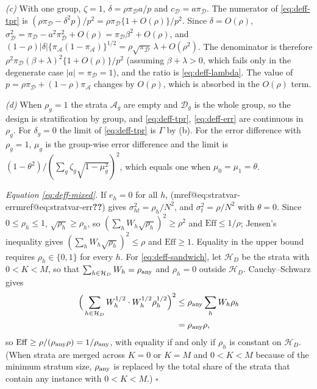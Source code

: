 \documentclass[pdflatex,sn-mathphys-num,iicol]{sn-jnl}
\makeatletter
\theoremstyle{thmstyleone}
\theoremstyle{thmstyletwo}
\theoremstyle{thmstylethree}
\newcommand{\Mref}[1]{\ifcsname mref@#1\endcsname\csname mref@#1\endcsname\else\textbf{??}\fi}
\makeatother
\begin{document}
\emph{(c)} With one group, $\zeta=1$, $\delta=\rho\pi_{\mathcal D}a/p$ and
$c_{\mathcal D}=a\pi_{\mathcal D}$. The numerator of \eqref{eq:deff-tpr} is
$(\rho\pi_{\mathcal D}-\delta^2p)/p^2=\rho\pi_{\mathcal D}\{1+O(\rho)\}/p^2$. Since $\delta=O(\rho)$,
$\sigma^2_{\mathcal D}=\pi_{\mathcal D}-a^2\pi_{\mathcal D}^2+O(\rho)=\pi_{\mathcal D}\beta^2+O(\rho)$, and
$(1-\rho)|\delta|\{\pi_{\mathcal A}(1-\pi_{\mathcal A})\}^{1/2}=\rho\sqrt{\pi_{\mathcal D}}\,\lambda+O(\rho^2)$.
The denominator is therefore $\rho^2\pi_{\mathcal D}(\beta+\lambda)^2\{1+O(\rho)\}/p^2$ (assuming
$\beta+\lambda>0$, which fails only in the degenerate case $|a|=\pi_{\mathcal D}=1$), and the ratio is
\eqref{eq:deff-lambda}. The value of $p=\rho\pi_{\mathcal D}+(1-\rho)\pi_{\mathcal A}$ changes by
$O(\rho)$, which is absorbed in the $O(\rho)$ term.

\emph{(d)} When $\rho_g=1$ the strata $\mathcal A_g$ are empty and $\mathcal D_g$ is the whole group,
so the design is stratification by group, and \eqref{eq:deff-tpr}, \eqref{eq:deff-err} are continuous
in $\rho_g$. For $\delta_g=0$ the limit of \eqref{eq:deff-tpr} is $\Gamma$ by (b). For the error
difference with $\rho_g=1$, $\mu_g$ is the group-wise error difference and the limit is
$(1-\theta^2)/(\sum_g\zeta_g\sqrt{1-\mu_g^2})^2$, which equals one when $\mu_0=\mu_1=\theta$.

\emph{Equation \eqref{eq:deff-mixed}.} If $e_h=0$ for all $h$, (\Mref{eq:stratvar-err}) gives
$\sigma^2_{ht}=\rho_h/N^2$, and $\sigma^2_t=\rho/N^2$ with $\theta=0$. Since $0\le\rho_h\le1$,
$\sqrt{\rho_h}\ge\rho_h$, so $(\sum_hW_h\sqrt{\rho_h})^2\ge\rho^2$ and $\mathrm{Eff}\le1/\rho$; Jensen's
inequality gives $(\sum_hW_h\sqrt{\rho_h})^2\le\rho$ and $\mathrm{Eff}\ge1$. Equality in the upper bound
requires $\rho_h\in\{0,1\}$ for every $h$. For \eqref{eq:deff-sandwich}, let $\mathcal H_D$ be the
strata with $0<K<M$, so that $\sum_{h\in\mathcal H_D}W_h=\rho_{\rm any}$ and $\rho_h=0$ outside
$\mathcal H_D$. Cauchy--Schwarz gives
\begin{align*}
\Big(\sum_{h\in\mathcal H_D}W_h^{1/2}\cdot W_h^{1/2}\rho_h^{1/2}\Big)^2&\le\rho_{\rm any}\sum_hW_h\rho_h\\
&=\rho_{\rm any}\rho,
\end{align*}
so $\mathrm{Eff}\ge\rho/(\rho_{\rm any}\rho)=1/\rho_{\rm any}$, with equality if and only if $\rho_h$ is
constant on $\mathcal H_D$. (When strata are merged across $K=0$ or $K=M$ and $0<K<M$ because of the
minimum stratum size, $\rho_{\rm any}$ is replaced by the total share of the strata that contain
any instance with $0<K<M$.) $\square$
\end{document}
